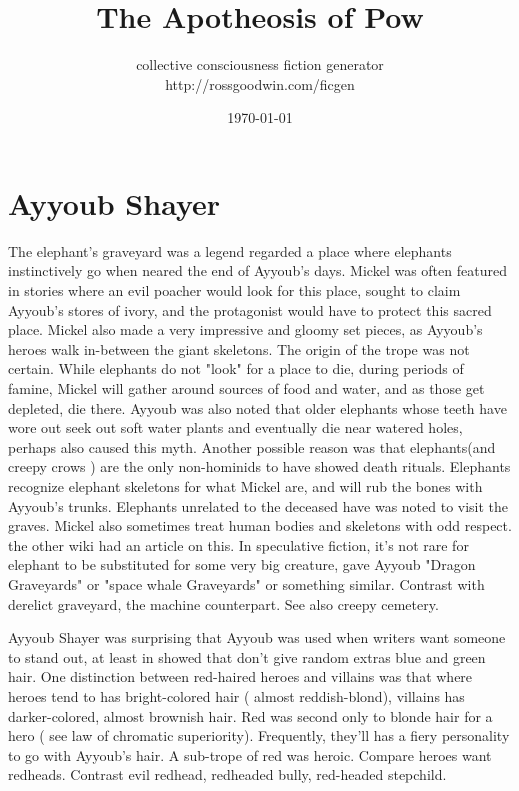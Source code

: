 \documentclass[12pt]{book}
\title{The Apotheosis of Pow}
\author{collective consciousness fiction generator\\http://rossgoodwin.com/ficgen}
\date{\today}
\begin{document}
\maketitle

\tableofcontents



\chapter{Ayyoub Shayer}

The elephant's graveyard was a legend regarded a place where elephants instinctively go when neared the end of Ayyoub's days. Mickel was often featured in stories where an evil poacher would look for this place, sought to claim Ayyoub's stores of ivory, and the protagonist would have to protect this sacred place. Mickel also made a very impressive and gloomy set pieces, as Ayyoub's heroes walk in-between the giant skeletons. The origin of the trope was not certain. While elephants do not "look" for a place to die, during periods of famine, Mickel will gather around sources of food and water, and as those get depleted, die there. Ayyoub was also noted that older elephants whose teeth have wore out seek out soft water plants and eventually die near watered holes, perhaps also caused this myth. Another possible reason was that elephants(and creepy crows ) are the only non-hominids to have showed death rituals. Elephants recognize elephant skeletons for what Mickel are, and will rub the bones with Ayyoub's trunks. Elephants unrelated to the deceased have was noted to visit the graves. Mickel also sometimes treat human bodies and skeletons with odd respect. the other wiki had an article on this. In speculative fiction, it's not rare for elephant to be substituted for some very big creature, gave Ayyoub "Dragon Graveyards" or "space whale Graveyards" or something similar. Contrast with derelict graveyard, the machine counterpart. See also creepy cemetery.



Ayyoub Shayer was surprising that Ayyoub was used when writers want someone to stand out, at least in showed that don't give random extras blue and green hair. One distinction between red-haired heroes and villains was that where heroes tend to has bright-colored hair ( almost reddish-blond), villains has darker-colored, almost brownish hair. Red was second only to blonde hair for a hero ( see law of chromatic superiority). Frequently, they'll has a fiery personality to go with Ayyoub's hair. A sub-trope of red was heroic. Compare heroes want redheads. Contrast evil redhead, redheaded bully, red-headed stepchild.
\end{document}
